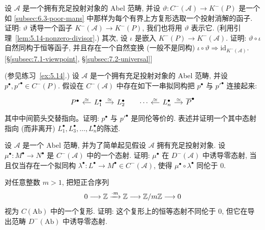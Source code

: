 \begin{prob}\label{ex:6.4}
设 $\mathcal{A}$ 是一个拥有充足投射对象的 Abel 范畴, 并设 $\vartheta:C^{-}(\mathcal{A})\to K^{-}(P)$ 是一个如 \ref{subsec:6.3-poor-mans} 中那样为每个有界上方复形选取一个投射消解的函子. 证明: $\vartheta$ 诱导一个函子 $K^{-}(\mathcal{A})\to K^{-}(P)$, 我们也将用 $\vartheta$ 表示它. (利用引理~\ref{lem:5.14-nonzero-divisor}.) 其次, 设 $\iota$ 是嵌入 $K^{-}(P)\to K^{-}(\mathcal{A})$. 证明: $\vartheta\circ\iota$ 自然同构于恒等函子, 并且存在一个自然变换 (一般不是同构) $\iota\circ\vartheta\Rightarrow\mathrm{id}_{K^{-}(\mathcal{A})}$. [\S\ref{subsec:7.1-viewpoint}, \S\ref{subsec:7.2-universal}]
\end{prob}

\begin{prob}\label{ex:6.5}
(参见练习~\ref{ex:5.14}.) 设 $\mathcal{A}$ 是一个拥有充足投射对象的 Abel 范畴, 并设 $p^\bullet,p'^\bullet\in C^{-}(P)$. 假设在 $C^{-}(\mathcal{A})$ 中存在如下一串拟同构把 $p^\bullet$ 与 $p'^\bullet$ 连接起来:
\[
\begin{tikzcd}[column sep=small]
P^\bullet & L_1^\bullet\ar[l,"\simeq"']\ar[r,"\simeq"] & L_2^\bullet & \cdots & L_n^\bullet\ar[l,"\simeq"']\ar[r,"\simeq"] & \overline P^\bullet
\end{tikzcd}
\]
其中中间箭头交替指向。证明: $p^\bullet$ 与 $p'^\bullet$ 是同伦等价的. 表述并证明一个其中态射指向 (而非离开) $L_1^\bullet,L_3^\bullet,\ldots,L_n^\bullet$的陈述.
\end{prob}

\begin{prob}\label{ex:6.6}
设 $\mathcal{A}$ 是一个 Abel 范畴, 并为了简单起见假设 $\mathcal{A}$ 拥有充足投射对象. 设 $\mu^\bullet:M^\bullet\to N^\bullet$ 是 $C^{-}(\mathcal{A})$ 中的一个态射. 证明: $\mu^\bullet$ 在 $D^{-}(\mathcal{A})$ 中诱导零态射, 当且仅当存在一个拟同构 $\lambda^\bullet:L^\bullet\to M^\bullet\in C^{-}(\mathcal{A})$, 使得 $\mu^\bullet\circ\lambda^\bullet$ 同伦于 $0$.
\end{prob}

\begin{prob}\label{ex:6.7}
对任意整数 $m>1$, 把短正合序列
\[
0\longrightarrow\mathbb{Z}\xrightarrow{\cdot m}\mathbb{Z}\longrightarrow\mathbb{Z}/m\mathbb{Z}\longrightarrow 0
\]
视为 $C(\mathrm{Ab})$ 中的一个复形. 证明: 这个复形上的恒等态射不同伦于 $0$, 但它在导出范畴 $D^{-}(\mathrm{Ab})$ 中诱导零态射.
\end{prob}

